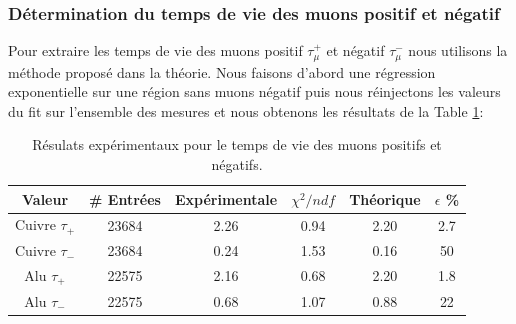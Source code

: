 \documentclass[12pt]{article}
\begin{document}
\subsubsection{Détermination du temps de vie des muons positif et négatif}

Pour extraire les temps de vie des muons positif $\tau^{+}_{\mu}$ et négatif $\tau^{-}_{\mu}$ nous utilisons la méthode proposé dans la théorie. Nous faisons d'abord une régression exponentielle sur une région sans muons négatif puis nous réinjectons les valeurs du fit sur l'ensemble des mesures et nous obtenons les résultats de la Table \ref{TauPositifNegatif}:


\begin{table}[htbp!]
  \centering
  \caption{Résulats expérimentaux pour le temps de vie des muons positifs et négatifs.}
  \begin{tabular}{||c|c|c|c|c|c||}
    \hline
     Valeur & \# Entrées & Expérimentale & $\chi^{2}/ndf$  & Théorique & $\epsilon$ \%\\
    \hline\hline
    Cuivre $\tau_{+}$ & 23684 & 2.26 & 0.94 & 2.20 & 2.7\\
    \hline
    Cuivre $\tau_{-}$ & 23684 & 0.24 & 1.53 & 0.16 & 50 \\
    \hline
    Alu $\tau_{+}$ & 22575 & 2.16 & 0.68 & 2.20 & 1.8\\
    \hline
    Alu $\tau_{-}$ & 22575 & 0.68 & 1.07 & 0.88 & 22\\
    \hline
\end{tabular}
\label{TauPositifNegatif}
\end{table}
\end{document}
